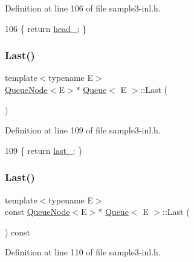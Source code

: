 Definition at line 106 of file sample3-\/inl.\+h.


\begin{DoxyCode}
106 \{ \textcolor{keywordflow}{return} \hyperlink{classQueue_abf9219bcea800d26e8bfdb4777d98729}{head\_}; \}
\end{DoxyCode}
\mbox{\label{classQueue_a430aca3d3b9f5fd588b215028d134b74}} 
\subsubsection{\texorpdfstring{Last()}{Last()}\hspace{0.1cm}{\footnotesize\ttfamily [1/2]}}
{\footnotesize\ttfamily template$<$typename E$>$ \\
\hyperlink{classQueueNode}{Queue\+Node}$<$E$>$$\ast$ \hyperlink{classQueue}{Queue}$<$ E $>$\+::Last (\begin{DoxyParamCaption}{ }\end{DoxyParamCaption})\hspace{0.3cm}{\ttfamily [inline]}}



Definition at line 109 of file sample3-\/inl.\+h.


\begin{DoxyCode}
109 \{ \textcolor{keywordflow}{return} \hyperlink{classQueue_a7466dca4f96147c9124af582ab170df0}{last\_}; \}
\end{DoxyCode}
\mbox{\label{classQueue_a7c8c2c64700dfe1df8bf266572cf101a}} 
\subsubsection{\texorpdfstring{Last()}{Last()}\hspace{0.1cm}{\footnotesize\ttfamily [2/2]}}
{\footnotesize\ttfamily template$<$typename E$>$ \\
const \hyperlink{classQueueNode}{Queue\+Node}$<$E$>$$\ast$ \hyperlink{classQueue}{Queue}$<$ E $>$\+::Last (\begin{DoxyParamCaption}{ }\end{DoxyParamCaption}) const\hspace{0.3cm}{\ttfamily [inline]}}



Definition at line 110 of file sample3-\/inl.\+h.


